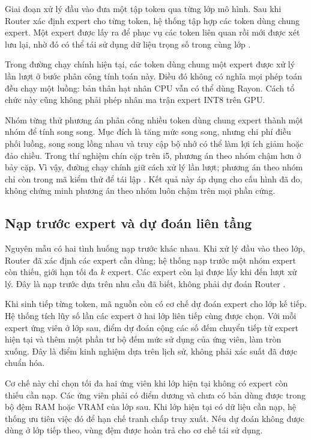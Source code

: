 Giai đoạn xử lý đầu vào đưa một tập token qua từng lớp mô hình. Sau khi Router xác định expert cho từng token, hệ thống tập hợp các token dùng chung expert. Một expert được lấy ra để phục vụ các token liên quan rồi mới được xét lưu lại, nhờ đó có thể tái sử dụng dữ liệu trọng số trong cùng lớp \cite{moe_tierengine_arch}.

Trong đường chạy chính hiện tại, các token dùng chung một expert được xử lý lần lượt ở bước phân công tính toán này. Điều đó không có nghĩa mọi phép toán đều chạy một luồng: bản thân hạt nhân CPU vẫn có thể dùng Rayon. Cách tổ chức này cũng không phải phép nhân ma trận expert INT8 trên GPU.

Nhóm từng thử phương án phân công nhiều token dùng chung expert thành một nhóm để tính song song. Mục đích là tăng mức song song, nhưng chi phí điều phối luồng, song song lồng nhau và truy cập bộ nhớ có thể làm lợi ích giảm hoặc đảo chiều. Trong thí nghiệm chín cặp trên i5, phương án theo nhóm chậm hơn ở bảy cặp. Vì vậy, đường chạy chính giữ cách xử lý lần lượt; phương án theo nhóm chỉ còn trong mã kiểm thử để tái lập \cite{exp_prefill_i5}. Kết quả này áp dụng cho cấu hình đã đo, không chứng minh phương án theo nhóm luôn chậm trên mọi phần cứng.

\subsection{Nạp trước expert và dự đoán liên tầng}

Nguyên mẫu có hai tình huống nạp trước khác nhau. Khi xử lý đầu vào theo lớp, Router đã xác định các expert cần dùng; hệ thống nạp trước một nhóm expert còn thiếu, giới hạn tối đa $k$ expert. Các expert còn lại được lấy khi đến lượt xử lý. Đây là nạp trước dựa trên nhu cầu đã biết, không phải dự đoán Router \cite{moe_tierengine_arch}.

Khi sinh tiếp từng token, mã nguồn còn có cơ chế dự đoán expert cho lớp kế tiếp. Hệ thống tích lũy số lần các expert ở hai lớp liên tiếp cùng được chọn. Với mỗi expert ứng viên ở lớp sau, điểm dự đoán cộng các số đếm chuyển tiếp từ expert hiện tại và thêm một phần tư bộ đếm mức sử dụng của ứng viên, làm tròn xuống. Đây là điểm kinh nghiệm dựa trên lịch sử, không phải xác suất đã được chuẩn hóa.

Cơ chế này chỉ chọn tối đa hai ứng viên khi lớp hiện tại không có expert còn thiếu cần nạp. Các ứng viên phải có điểm dương và chưa có bản dùng được trong bộ đệm RAM hoặc VRAM của lớp sau. Khi lớp hiện tại có dữ liệu cần nạp, hệ thống ưu tiên việc đó để hạn chế tranh chấp truy xuất. Nếu dự đoán không được dùng ở lớp tiếp theo, vùng đệm được hoàn trả cho cơ chế tái sử dụng.

